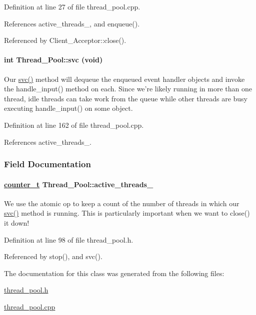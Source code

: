 Definition at line 27 of file thread\_\-pool.cpp.

References active\_\-threads\_\-, and enqueue().

Referenced by Client\_\-Acceptor::close().\hypertarget{classThread__Pool_Thread__Poolb0}{
\paragraph[svc]{\setlength{\rightskip}{0pt plus 5cm}int Thread\_\-Pool::svc (void)}\hfill}
\label{classThread__Pool_Thread__Poolb0}


Our \hyperlink{classThread__Pool_Thread__Poolb0}{svc()} method will dequeue the enqueued event handler objects and invoke the handle\_\-input() method on each. Since we're likely running in more than one thread, idle threads can take work from the queue while other threads are busy executing handle\_\-input() on some object. 

Definition at line 162 of file thread\_\-pool.cpp.

References active\_\-threads\_\-.

\subsubsection{Field Documentation}
\hypertarget{classThread__Pool_Thread__Pooln0}{
\paragraph[active\_\-threads\_\-]{\setlength{\rightskip}{0pt plus 5cm}\hyperlink{classThread__Pool_Thread__Pools1}{counter\_\-t} Thread\_\-Pool::active\_\-threads\_\-}\hfill}
\label{classThread__Pool_Thread__Pooln0}


We use the atomic op to keep a count of the number of threads in which our \hyperlink{classThread__Pool_Thread__Poolb0}{svc()} method is running. This is particularly important when we want to close() it down! 

Definition at line 98 of file thread\_\-pool.h.

Referenced by stop(), and svc().

The documentation for this class was generated from the following files:\begin{CompactItemize}
\item 
\hyperlink{thread__pool_8h}{thread\_\-pool.h}\item 
\hyperlink{thread__pool_8cpp}{thread\_\-pool.cpp}\end{CompactItemize}

